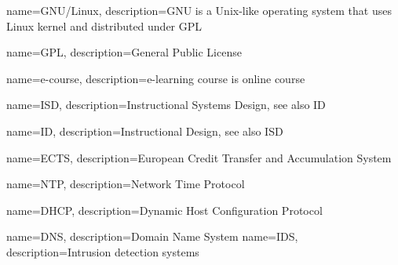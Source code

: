 {
  name=GNU/Linux,
  description={GNU is a Unix-like operating system that uses Linux kernel and distributed under \gls{GPL}}
}


{
  name=GPL,
  description={General Public License}
}

{
  name=e-course,
  description={e-learning course is online course}
}

{
  name=ISD,
  description={Instructional Systems Design, see also \gls{ID}}
}

{
  name=ID,
  description={Instructional Design, see also \gls{ISD}}
}

{
  name=ECTS,
  description={European Credit Transfer and Accumulation System}
}

{
  name=NTP,
  description={Network Time Protocol}
}

{
  name=DHCP,
  description={Dynamic Host Configuration Protocol}
}

{
  name=DNS,
  description={Domain Name System}
}
{
  name=IDS,
  description={Intrusion detection systems}
}

